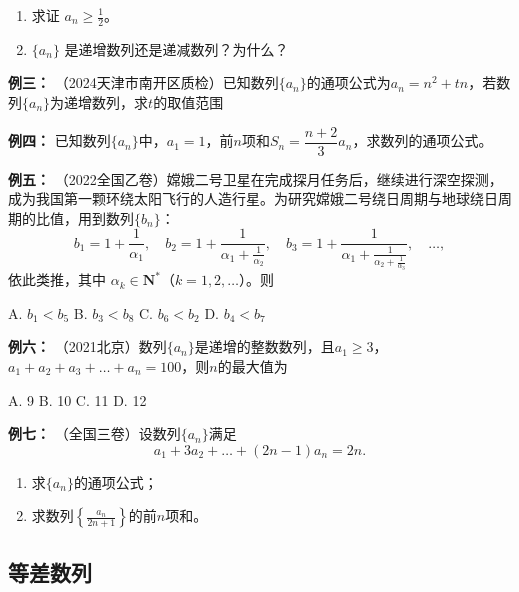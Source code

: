 \documentclass{article}
\begin{document}
\begin{enumerate}
    \item 求证 \(a_n \ge \frac{1}{2}\)。
    \item \(\{a_n\}\) 是递增数列还是递减数列？为什么？
\end{enumerate}
\vspace{15\baselineskip}

\noindent\textbf{例三： }（2024天津市南开区质检）已知数列$\{a_n\}$的通项公式为$a_n = n^2 + tn$，若数列$\{a_n\}$为递增数列，求$t$的取值范围
\newpage

\noindent\textbf{例四： } 已知数列$\{a_n\}$中，$a_1 = 1$，前$n$项和$S_n = \dfrac{n+2}{3}a_n$，求数列的通项公式。
\vspace{15\baselineskip}

\noindent\textbf{例五： }（2022全国乙卷）嫦娥二号卫星在完成探月任务后，继续进行深空探测，成为我国第一颗环绕太阳飞行的人造行星。为研究嫦娥二号绕日周期与地球绕日周期的比值，用到数列$\{b_n\}$：
\[
b_1 = 1 + \frac{1}{\alpha_1},\quad
b_2 = 1 + \frac{1}{\alpha_1 + \frac{1}{\alpha_2}},\quad
b_3 = 1 + \frac{1}{\alpha_1 + \frac{1}{\alpha_2 + \frac{1}{\alpha_3}}},\quad \dots,
\]
依此类推，其中 $\alpha_k \in \mathbf{N}^*$（$k=1,2,\dots$）。则

\vspace{1em}
A. $b_1 < b_5$ \quad
B. $b_3 < b_8$ \quad
C. $b_6 < b_2$ \quad
D. $b_4 < b_7$
\vspace{5\baselineskip}

\noindent\textbf{例六： }（2021北京）数列$\{a_n\}$是递增的整数数列，且$a_1 \ge 3$，$a_1 + a_2 + a_3 + \dots + a_n = 100$，则$n$的最大值为

\vspace{1em}
A. 9 \quad
B. 10 \quad
C. 11 \quad
D. 12
\vspace{5\baselineskip}

\noindent\textbf{例七： }（全国三卷）设数列$\{a_n\}$满足
\[
a_1 + 3a_2 + \dots + (2n-1)a_n = 2n.
\]

\vspace{1em}
\begin{enumerate}
    \item 求$\{a_n\}$的通项公式；
    \item 求数列$\left\{\frac{a_n}{2n+1}\right\}$的前$n$项和。
\end{enumerate}
\newpage

\subsection{等差数列}
\end{document}
